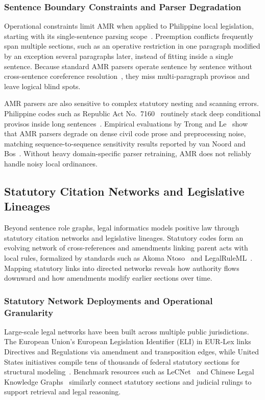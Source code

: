         \subsubsection{Sentence Boundary Constraints and Parser Degradation}
        Operational constraints limit AMR when applied to Philippine local legislation, starting with its single-sentence parsing scope~\cite{tohidi2024abstract}. Preemption conflicts frequently span multiple sections, such as an operative restriction in one paragraph modified by an exception several paragraphs later, instead of fitting inside a single sentence. Because standard AMR parsers operate sentence by sentence without cross-sentence coreference resolution~\cite{tohidi2024abstract}, they miss multi-paragraph provisos and leave logical blind spots.

        AMR parsers are also sensitive to complex statutory nesting and scanning errors. Philippine codes such as Republic Act No.~7160~\cite{philgov1991ra7160} routinely stack deep conditional provisos inside long sentences~\cite{bernardo2023disambiguating}. Empirical evaluations by Trong and Le~\cite{trong2018an} show that AMR parsers degrade on dense civil code prose and preprocessing noise, matching sequence-to-sequence sensitivity results reported by van Noord and Bos~\cite{vannoord2017the}. Without heavy domain-specific parser retraining, AMR does not reliably handle noisy local ordinances.

    \subsection{Statutory Citation Networks and Legislative Lineages}
    Beyond sentence role graphs, legal informatics models positive law through statutory citation networks and legislative lineages. Statutory codes form an evolving network of cross-references and amendments linking parent acts with local rules, formalized by standards such as Akoma Ntoso~\cite{vitali2007towards} and LegalRuleML~\cite{palmirani2021legalruleml, athan2013legalruleml}. Mapping statutory links into directed networks reveals how authority flows downward and how amendments modify earlier sections over time.

        \subsubsection{Statutory Network Deployments and Operational Granularity}
        Large-scale legal networks have been built across multiple public jurisdictions. The European Union's European Legislation Identifier (ELI) in EUR-Lex links Directives and Regulations via amendment and transposition edges, while United States initiatives compile tens of thousands of federal statutory sections for structural modeling~\cite{bommarito2025kl3m, katz_2023_legal_nlp}. Benchmark resources such as LeCNet~\cite{harde2025lecnet} and Chinese Legal Knowledge Graphs~\cite{li2024construction} similarly connect statutory sections and judicial rulings to support retrieval and legal reasoning.

